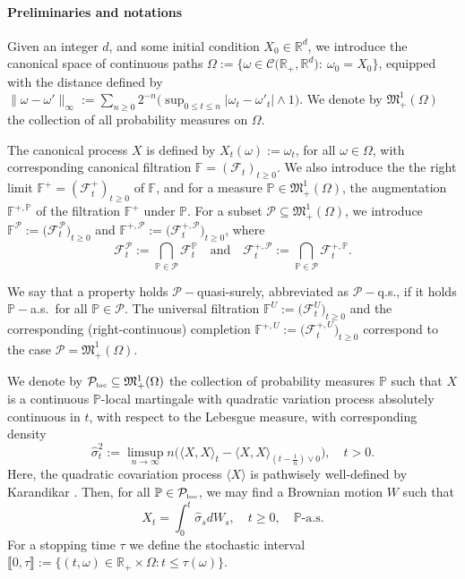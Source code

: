\documentclass[11pt,a4paper]{article}
\numberwithin{equation}{section}
\def\dbF{\mathbb{F}}
\def\dbP{\mathbb{P}}
\def\dbR{\mathbb{R}}
\newcommand{\cC}{\mathcal{C}}
\newcommand{\cF}{\mathcal{F}}
\newcommand{\cP}{\mathcal{P}}
\theoremstyle{definition}
\begin{document}
\paragraph{Preliminaries and notations}

Given an integer $d$, and some initial condition $X_0\in\dbR^d$, we introduce the canonical space of continuous paths $\Omega:=\big\{\omega\in\cC\big(\dbR_+, \dbR^d\big):~\omega_0=X_0 \big\}$, 
   equipped with the distance defined by $ \|\omega-\omega'\|_\infty:=\sum_{n\ge 0}2^{-n}\big(\sup_{0\leq t\leq n}|\omega_{t}-\omega'_{t}|\wedge 1\big).$ We denote by $\mathfrak{M}_+^1(\Omega)$ the collection of all probability measures on $\Omega$.
 
The canonical process $X$ is defined by $X_t(\omega) := \omega_t$, for all $\omega\in\Omega$, with corresponding canonical filtration $\dbF=(\cF_t)_{t\geq 0}$. 
 We also introduce the  the right limit $\dbF^+=(\cF^+_t)_{t\geq 0}$  of $\dbF$, and for a measure $\dbP\in\mathfrak{M}_+^1(\Omega)$, the augmentation $\dbF^{+,\dbP}$ of the filtration $\dbF^+$ under $\dbP$. 
 For a subset $\cP\subseteq\mathfrak{M}_+^1(\Omega)$, we introduce $\dbF^\cP:=\big(\cF^\cP_t\big)_{t\geq 0}$ and $\dbF^{+,\cP}:=\big(\cF^{+,\cP}_t\big)_{t\geq 0}$, where
  $$ \cF_t^\cP:=\bigcap_{\dbP\in\cP}\cF_t^\dbP \quad \mbox{and} \quad \cF^{+,\cP}_t := \bigcap_{\dbP\in\cP}\cF^{+,\dbP}_t.  $$
 
 We say that a property holds $\cP-$quasi-surely, abbreviated as $\cP-$q.s., if it holds $\dbP-$a.s.~for all $\dbP\in\cP$. 
 The universal filtration $\dbF^U:=\big(\cF^U_t\big)_{t\geq 0}$ and the corresponding (right-continuous) completion $\dbF^{+,U}:=\big(\cF^{+,U}_t\big)_{t\geq 0}$ correspond to the case $\cP=\mathfrak{M}_+^1(\Omega)$.

 We denote by $\cP_{\mbox{\tiny loc}}\subseteq\mathfrak{M}_+^1(\Omega)$ the collection of probability measures $\dbP$ such that $X$ is a continuous $\dbP$-local martingale with quadratic variation process absolutely continuous in $t$, 
   with respect to the Lebesgue measure, with corresponding density
   \begin{equation*}
     \widehat{\sigma}^2_t := \limsup_{n\rightarrow \infty} n \big(\langle X, X\rangle_t-\langle X, X\rangle_{(t-\frac{1}{n})\vee 0}\big), \quad t>0.
   \end{equation*}
 Here, the quadratic covariation process $\langle X \rangle$ is pathwisely well-defined by Karandikar \cite{Kar95}.  
 Then, for all $\dbP\in \cP_{\mbox{\tiny loc}}$, we may find a Brownian motion $W$ such that
   \begin{equation*}
     X_t = \int^t_0\widehat{\sigma}_sdW_s, \quad t\geq 0, \quad \dbP\mbox{-a.s.}
   \end{equation*}
For a stopping time $\tau$ we define the stochastic interval
  $\llbracket 0, \tau\rrbracket:=\{(t,\omega)\in\dbR_+\times\Omega:t\leq\tau(\omega)\}$.
\end{document}

